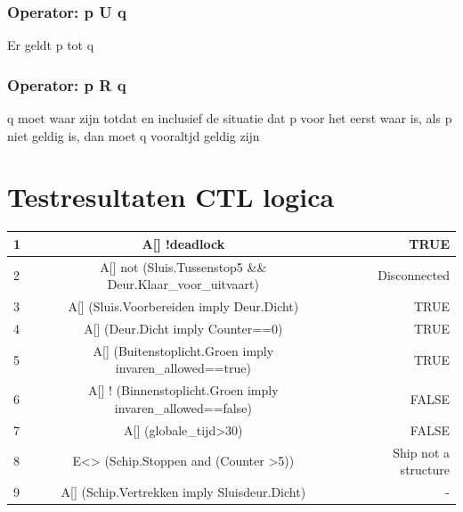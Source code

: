 \subsection{Operator: p U q}
Er geldt p tot q
~\cite{gnsguides}
\subsection{Operator: p R q}
q moet waar zijn totdat en inclusief de situatie dat p voor het eerst waar is, als p niet geldig is, dan moet q vooraltjd geldig zijn

\chapter{Testresultaten CTL logica}




\begin{center}
	\begin{tabular}{| l | c || r | }
		\hline
		1 &A[] !deadlock  &  TRUE \\ \hline
		2 & A[] not (Sluis.Tussenstop5 \&\& Deur.Klaar\_voor\_uitvaart)  &  Disconnected \\ \hline
		3 & A[]  (Sluis.Voorbereiden imply Deur.Dicht)   &  TRUE\\   \hline
		4 &A[]  (Deur.Dicht imply Counter==0)   & TRUE  \\   \hline
		5 & A[]  (Buitenstoplicht.Groen imply invaren\_allowed==true)  &  TRUE \\ \hline
		6 & A[] ! (Binnenstoplicht.Groen imply invaren\_allowed==false)  & FALSE \\ \hline
		7 & A[]  (globale\_tijd>30)   &  FALSE\\    \hline
		8 & E<>  (Schip.Stoppen and (Counter >5))   & Ship not a structure  \\   \hline
		9 & A[] (Schip.Vertrekken imply Sluisdeur.Dicht)  &  -  \\   \hline
		\hline
	\end{tabular}
\end{center}


 
%
%
%








